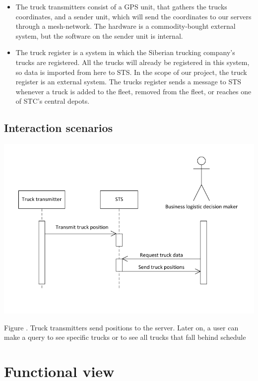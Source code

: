 \documentclass[a4paper,11pt]{report}
\newcommand{\mycaption}[1]{
  \addtocounter{figures}{1}
  Figure \arabic{figures}. #1
}
\begin{document}
\begin{itemize}
\item The truck transmitters consist of a GPS unit, that gathers the trucks coordinates, and a sender unit, which will send the coordinates to our servers through a mesh-network. The hardware is a commodity-bought external system, but the software on the sender unit is internal.
\item The truck register is a system in which the Siberian trucking company's trucks are registered.  All the trucks will already be registered in this system, so data is imported from here to STS.  In the scope of our project, the truck register is an external system.  The trucks register sends a message to STS whenever a truck is added to the fleet, removed from the fleet, or reaches one of STC's central depots.
\end{itemize}


\subsection{Interaction scenarios}
\label{sec:inter-scen}

\begin{center}
  \includegraphics[width=\textwidth]{figures/interaction_scenario_1}\\
  \mycaption{Truck transmitters send positions to the server.  Later on, a user can make a query to see specific trucks or to see all trucks that fall behind schedule}
\end{center}



\section{Functional view}
\label{sec:functional-view}
\end{document}
